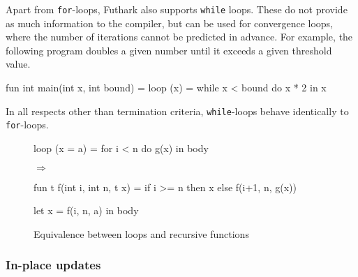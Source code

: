 \documentclass[oneside]{memoir}
\begin{document}
Apart from \texttt{for}-loops, Futhark also supports \texttt{while}
loops.  These do not provide as much information to the compiler, but
can be used for convergence loops, where the number of iterations
cannot be predicted in advance.  For example, the following program
doubles a given number until it exceeds a given threshold value.

\begin{colorcode}
  fun int main(int x, int bound) =
    loop (x) = while x < bound do x * 2
    in x
\end{colorcode}

In all respects other than termination criteria, \texttt{while}-loops
behave identically to \texttt{for}-loops.

\begin{figure}
\begin{center}
\begin{minipage}{0.3\columnwidth}
\begin{colorcode}
loop (x = a) =
  for i < n do
    g(x)
in body
\end{colorcode}
\end{minipage}
\begin{minipage}{0.05\columnwidth}
$\Rightarrow$
\end{minipage}
\begin{minipage}{0.4\columnwidth}
\begin{colorcode}
fun t f(int i, int n, t x) =
  if i >= n then x
     else f(i+1, n, g(x))

let x = f(i, n, a)
in body
\end{colorcode}
\end{minipage}
\end{center}
\caption{Equivalence between loops and recursive functions}
\label{fig:loop-recursion}
\end{figure}

\subsubsection{In-place updates}
\label{sec:in-place-updates}
\end{document}
